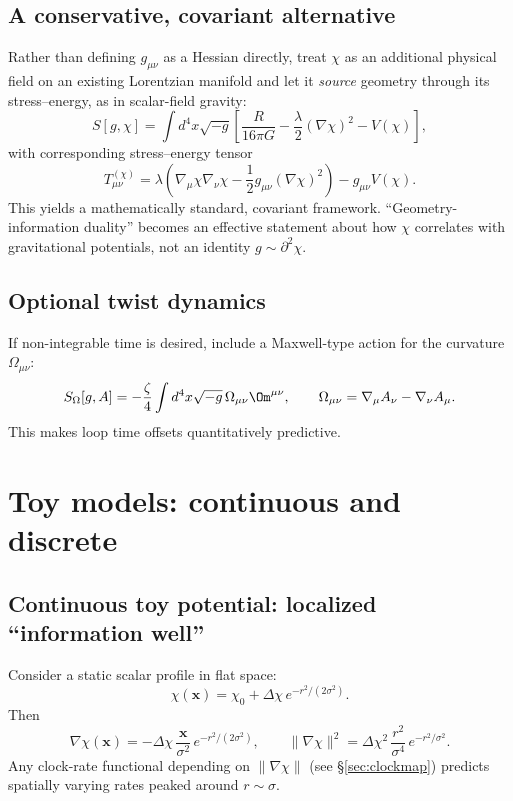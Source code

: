 \documentclass[11pt]{article}
\newcommand{\Omuv}{\Omega_{\mu\nu}}
\begin{document}
    \subsection{A conservative, covariant alternative}
        Rather than defining $g_{\mu\nu}$ as a Hessian directly, treat $\chi$ as an additional physical field on an existing Lorentzian manifold and let it \emph{source} geometry through its stress--energy, as in scalar-field gravity:
        \begin{equation}
            S[g,\chi] = \int d^4x\sqrt{-g}\left[\frac{R}{16\pi G} -\frac{\lambda}{2}(\nabla\chi)^2 - V(\chi)\right],
            \label{eq:action_scalar}
        \end{equation}
        with corresponding stress--energy tensor \cite{Wald1984_GR}
        \begin{equation}
            T_{\mu\nu}^{(\chi)} = \lambda\left(\nabla_\mu\chi\nabla_\nu\chi-\frac{1}{2}g_{\mu\nu}(\nabla\chi)^2\right) - g_{\mu\nu}V(\chi).
            \label{eq:Tmunu_scalar}
        \end{equation}
        This yields a mathematically standard, covariant framework. ``Geometry-information duality'' becomes an effective statement about how $\chi$ correlates with gravitational potentials, not an identity $g\sim \partial^2\chi$.

    \subsection{Optional twist dynamics}
        If non-integrable time is desired, include a Maxwell-type action for the curvature $\Omuv$:
        \begin{equation}
            S_{\Omega}[g,A] = -\frac{\zeta}{4}\int d^4x\sqrt{-g}\,\Omuv\Om^{\mu\nu},\qquad \Omuv=\nabla_\mu A_\nu-\nabla_\nu A_\mu.
            \label{eq:action_twist}
        \end{equation}
        This makes loop time offsets quantitatively predictive.

    \section{Toy models: continuous and discrete}
    \subsection{Continuous toy potential: localized ``information well''}
        Consider a static scalar profile in flat space:
        \begin{equation}
            \chi(\mathbf{x}) = \chi_0 + \Delta\chi\, e^{-r^2/(2\sigma^2)}.
            \label{eq:gauss}
        \end{equation}
        Then
        \begin{equation}
            \nabla\chi(\mathbf{x}) = -\Delta\chi\,\frac{\mathbf{x}}{\sigma^2}\,e^{-r^2/(2\sigma^2)},
            \qquad
            \|\nabla\chi\|^2 = \Delta\chi^2\,\frac{r^2}{\sigma^4}\,e^{-r^2/\sigma^2}.
            \label{eq:grad_gauss}
        \end{equation}
        Any clock-rate functional depending on $\|\nabla\chi\|$ (see \S\ref{sec:clockmap}) predicts spatially varying rates peaked around $r\sim \sigma$.
\end{document}
